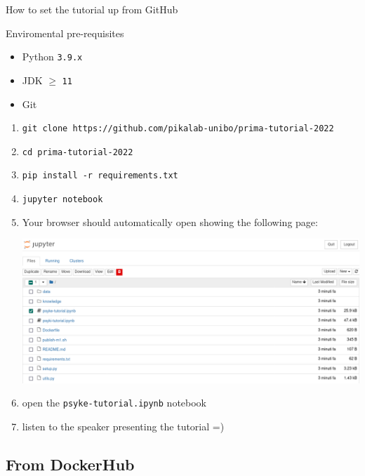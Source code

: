 \documentclass[presentation]{beamer}\mode<presentation>{\usetheme{AMSBolognaFC}}
\begin{document}
\begin{frame}[allowframebreaks]{How to set the tutorial up from GitHub}

    \begin{block}{Enviromental pre-requisites}
        \begin{itemize}
            \item Python \alert{\texttt{3.9.x}}
            \item JDK \alert{$\geq$ \texttt{11}}
            \item Git
        \end{itemize}
    \end{block}

    \begin{enumerate}
        \item \texttt{git clone https://github.com/pikalab-unibo/prima-tutorial-2022}
        \item \texttt{cd prima-tutorial-2022}
        \item \texttt{pip install -r requirements.txt}
        \item \texttt{jupyter notebook}
        \framebreak
        \item Your browser should automatically open showing the following page:
        \begin{center}
            \includegraphics[width=.7\linewidth]{figures/jupyter-git.png}
        \end{center}
        \item open the \texttt{psyke-tutorial.ipynb} notebook
        \item listen to the speaker presenting the tutorial =)
    \end{enumerate}
\end{frame}

\subsection{From DockerHub}
\end{document}
